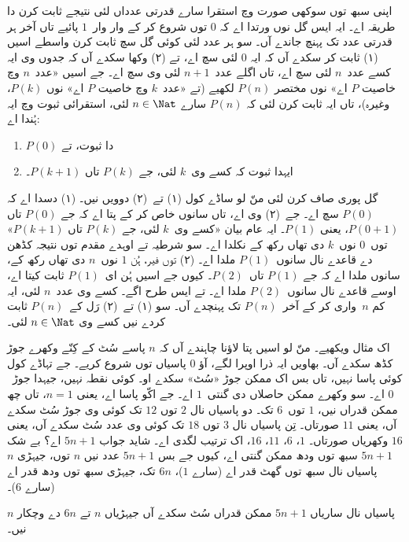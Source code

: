 \documentclass[../../../include/open-logic-section]{subfiles}
\begin{document}


اپنی سبھ توں سوکھی صورت وچ استقرا سارے قدرتی عدداں لئی نتیجے ثابت کرن دا طریقہ اے۔ ایہ ایس گل نوں ورتدا اے کہ $0$ توں شروع کر کے وار وار~$1$ پائیے تاں آخر ہر قدرتی عدد تک پہنچ جاندے آں۔ سو ہر عدد لئی کوئی گل سچ ثابت کرن واسطے اسیں (۱) ثابت کر سکدے آں کہ ایہ $0$ لئی سچ اے، تے (۲) وکھا سکدے آں کہ جدوں وی ایہ کسے عدد~$n$ لئی سچ اے، تاں اگلے عدد~$n+1$ لئی وی سچ اے۔ جے اسیں «عدد~$n$ وچ خاصیت $P$ اے» نوں مختصر $P(n)$ لکھیے (تے «عدد~$k$ وچ خاصیت $P$ اے» نوں $P(k)$، وغیرہ)، تاں ایہ ثابت کرن لئی کہ $P(n)$ سارے $n \in \Nat$ لئی، استقرائی ثبوت وچ ایہ ہُندا اے:
\begin{enumerate}
\item $P(0)$ دا ثبوت، تے
\item ایہدا ثبوت کہ کسے وی~$k$ لئی، جے $P(k)$ تاں $P(k+1)$۔
\end{enumerate}
گل پوری صاف کرن لئی منّ لو ساڈے کول (۱) تے~(۲) دوویں نیں۔ (۱) دسدا اے کہ $P(0)$ سچ اے۔ جے~(۲) وی اے، تاں سانوں خاص کر کے پتا اے کہ جے $P(0)$ تاں $P(0+1)$، یعنی $P(1)$۔ ایہ عام بیان «کسے وی~$k$ لئی، جے $P(k)$ تاں $P(k+1)$» توں~$0$ نوں~$k$ دی تھاں رکھ کے نکلدا اے۔ سو شرطیہ تے اوہدے مقدم توں نتیجہ کڈھن دے قاعدے نال سانوں~$P(1)$ ملدا اے۔ (۲) توں فیر، ہُن $1$ نوں~$n$ دی تھاں رکھ کے، سانوں ملدا اے کہ جے $P(1)$ تاں~$P(2)$۔ کیوں جے اسیں ہُن ای~$P(1)$ ثابت کیتا اے، اوسے قاعدے نال سانوں~$P(2)$ ملدا اے۔ تے ایس طرح اگے۔ کسے وی عدد~$n$ لئی، ایہ کم $n$~واری کر کے آخر~$P(n)$ تک پہنچدے آں۔ سو (۱) تے~(۲) رَل کے~$P(n)$ ثابت کردے نیں کسے وی $n
\in \Nat$ لئی۔

اک مثال ویکھیے۔ منّ لو اسیں پتا لاؤنا چاہندے آں کہ $n$ پاسے سُٹ کے کِنّے وکھرے جوڑ کڈھ سکدے آں۔ بھاویں ایہ ذرا اوپرا لگے، آؤ $0$ پاسیاں توں شروع کریے۔ جے تہاڈے کول کوئی پاسا نہیں، تاں بس اک ممکن جوڑ «سُٹ» سکدے او۔ کوئی نقطہ نہیں، جیہدا جوڑ~$0$ اے۔ سو وکھرے ممکن حاصلاں دی گنتی~$1$ اے۔ جے اکّو پاسا اے، یعنی $n=1$، تاں چھ ممکن قدراں نیں، $1$ توں~$6$ تک۔ دو پاسیاں نال $2$ توں $12$ تک کوئی وی جوڑ سُٹ سکدے آں، یعنی $11$ صورتاں۔ تِن پاسیاں نال $3$ توں $18$ تک کوئی وی عدد سُٹ سکدے آں، یعنی $16$ وکھریاں صورتاں۔ $1$، $6$، $11$، $16$، اک ترتیب لگدی اے۔ شاید جواب $5n+1$ اے؟ بے شک $5n+1$ سبھ توں ودھ ممکن گنتی اے، کیوں جے بس $5n+1$ عدد نیں $n$ توں، جیہڑی $n$ پاسیاں نال سبھ توں گھٹ قدر اے (سارے $1$)، $6n$ تک، جیہڑی سبھ توں ودھ قدر اے (سارے $6$)۔

\begin{thm}
  $n$ پاسیاں نال ساریاں $5n+1$ ممکن قدراں سُٹ سکدے آں جیہڑیاں $n$ تے $6n$ دے وچکار نیں۔
\end{thm}
\end{document}
